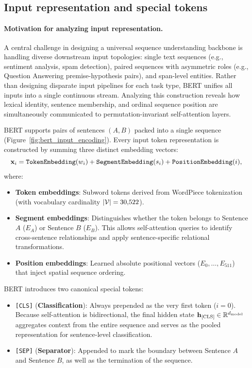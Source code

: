 \documentclass[../../main.tex]{subfiles}
\begin{document}
\subsection{Input representation and special tokens}
\label{subsec:bert_input_representation}

\paragraph{Motivation for analyzing input representation.}
A central challenge in designing a universal sequence understanding backbone is handling diverse downstream input topologies: single text sequences (e.g., sentiment analysis, spam detection), paired sequences with asymmetric roles (e.g., Question Answering premise-hypothesis pairs), and span-level entities. Rather than designing disparate input pipelines for each task type, BERT unifies all inputs into a single continuous stream. Analyzing this construction reveals how lexical identity, sentence membership, and ordinal sequence position are simultaneously communicated to permutation-invariant self-attention layers.

BERT supports pairs of sentences $(A, B)$ packed into a single sequence (Figure~\ref{fig:bert_input_encoding}). Every input token representation is constructed by summing three distinct embedding vectors:
\begin{equation}
\label{eq:bert_input_embedding_sum}
\mathbf{x}_i = \text{\texttt{TokenEmbedding}}(w_i) + \text{\texttt{SegmentEmbedding}}(s_i) + \text{\texttt{PositionEmbedding}}(i),
\end{equation}
where:
\begin{itemize}
    \item \textbf{Token embeddings}: Subword tokens derived from WordPiece tokenization (with vocabulary cardinality $|\mathcal{V}| = 30{,}522$).
    \item \textbf{Segment embeddings}: Distinguishes whether the token belongs to Sentence $A$ ($E_A$) or Sentence $B$ ($E_B$). This allows self-attention queries to identify cross-sentence relationships and apply sentence-specific relational transformations.
    \item \textbf{Position embeddings}: Learned absolute positional vectors ($E_0, \dots, E_{511}$) that inject spatial sequence ordering.
\end{itemize}

BERT introduces two canonical special tokens:
\begin{itemize}
    \item \texttt{[CLS]} (\textbf{Classification}): Always prepended as the very first token ($i = 0$). Because self-attention is bidirectional, the final hidden state $\mathbf{h}_{[\text{CLS}]} \in \mathbb{R}^{d_{\text{model}}}$ aggregates context from the entire sequence and serves as the pooled representation for sentence-level classification.
    \item \texttt{[SEP]} (\textbf{Separator}): Appended to mark the boundary between Sentence $A$ and Sentence $B$, as well as the termination of the sequence.
\end{itemize}
\end{document}
